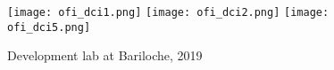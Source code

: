   \begin{figure}
      \begin{center}
         \texttt{[image: ofi\_dci1.png]}
         \texttt{[image: ofi\_dci2.png]}
         \texttt{[image: ofi\_dci5.png]}
      \end{center}
      \caption{Development lab at Bariloche, 2019}
      \label{fig:ofi_dci}
   \end{figure}
